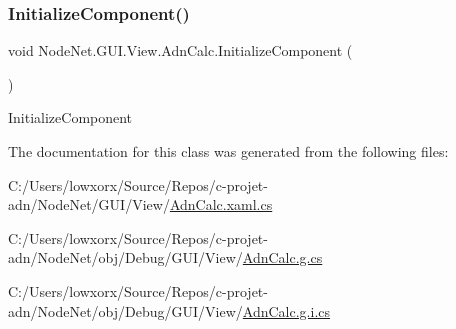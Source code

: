 \subsubsection{\texorpdfstring{Initialize\+Component()}{InitializeComponent()}\hspace{0.1cm}{\footnotesize\ttfamily [2/2]}}
{\footnotesize\ttfamily void Node\+Net.\+G\+U\+I.\+View.\+Adn\+Calc.\+Initialize\+Component (\begin{DoxyParamCaption}{ }\end{DoxyParamCaption})}



Initialize\+Component 



The documentation for this class was generated from the following files\+:\begin{DoxyCompactItemize}
\item 
C\+:/\+Users/lowxorx/\+Source/\+Repos/c-\/projet-\/adn/\+Node\+Net/\+G\+U\+I/\+View/\hyperlink{_adn_calc_8xaml_8cs}{Adn\+Calc.\+xaml.\+cs}\item 
C\+:/\+Users/lowxorx/\+Source/\+Repos/c-\/projet-\/adn/\+Node\+Net/obj/\+Debug/\+G\+U\+I/\+View/\hyperlink{_adn_calc_8g_8cs}{Adn\+Calc.\+g.\+cs}\item 
C\+:/\+Users/lowxorx/\+Source/\+Repos/c-\/projet-\/adn/\+Node\+Net/obj/\+Debug/\+G\+U\+I/\+View/\hyperlink{_adn_calc_8g_8i_8cs}{Adn\+Calc.\+g.\+i.\+cs}\end{DoxyCompactItemize}
